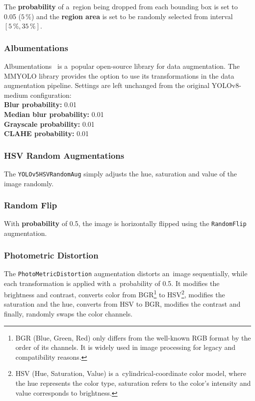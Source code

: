 The \textbf{probability} of a~region being dropped from each bounding box is set
to \num{0.05} ($5\,\%$) and the \textbf{region area} is set to be randomly selected from
interval $[5\,\%, 35\,\%]$.


\subsubsection*{Albumentations}

Albumentations~\cite{Albumentations} is a~popular open-source library for data
augmentation. The MMYOLO library provides the option to use its transformations
in the data augmentation pipeline. Settings are left unchanged from the original
YOLOv8-medium configuration: \\
\textbf{Blur probability:} 0.01 \\
\textbf{Median blur probability:} 0.01 \\
\textbf{Grayscale probability:} 0.01 \\
\textbf{CLAHE probability:} 0.01


\subsubsection*{HSV Random Augmentations}

The \texttt{YOLOv5HSVRandomAug} simply adjusts the hue, saturation and value of
the image randomly.


\subsubsection*{Random Flip}

With \textbf{probability} of 0.5, the image is horizontally flipped using the
\texttt{RandomFlip} augmentation.


\subsubsection*{Photometric Distortion}

The \texttt{PhotoMetricDistortion} augmentation distorts an~image sequentially,
while each transformation is applied with a~probability of 0.5. It modifies the
brightness and contrast, converts color from BGR\footnote{BGR (Blue, Green, Red)
only differs from the well-known RGB format by the order of its channels. It is
widely used in image processing for legacy and compatibility reasons.} to
HSV\footnote{HSV (Hue, Saturation, Value) is a~cylindrical-coordinate color
model, where the hue represents the color type, saturation refers to the color's
intensity and value corresponds to brightness.}, modifies the saturation and the
hue, converts from HSV to BGR, modifies the contrast and finally, randomly swaps
the color channels.


